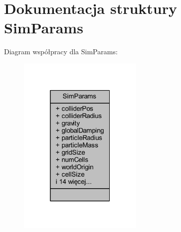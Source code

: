 \hypertarget{struct_sim_params}{\section{Dokumentacja struktury Sim\-Params}
\label{struct_sim_params}
}


Diagram współpracy dla Sim\-Params\-:\nopagebreak
\begin{figure}[H]
\begin{center}
\leavevmode
\includegraphics[width=169pt]{struct_sim_params__coll__graph}
\end{center}
\end{figure}
